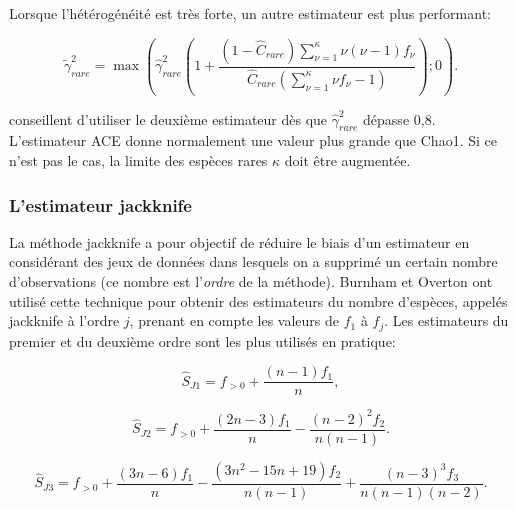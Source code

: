 \documentclass[
  11pt,
  american,
  a4paper,
  extrafontsizes,onecolumn,openright
  ]{memoir}
\newlength{\rf}
\begin{document}
Lorsque l'hétérogénéité est très forte, un autre estimateur est plus performant:

\begin{equation}
  \label{eq:ACEcv2}
  \tilde{\gamma}^{2}_\mathit{rare} 
  = \max\left(
    {\hat{\gamma}}^2_\mathit{rare} \left( 
      1 + \frac{
        \left( 1 - {\hat{C}}_\mathit{rare} \right) \sum^{\kappa}_{\nu = 1}{\nu\left( \nu - 1 \right){f_\nu}}
      }{
        {\hat{C}}_\mathit{rare} \left( \sum^{\kappa}_{\nu = 1}{\nu f_\nu - 1} \right)
      }
    \right) ; 0 
  \right).
\end{equation}

\textcite{Chao2010a} conseillent d'utiliser le deuxième estimateur dès que \({\hat{\gamma}}^2_\mathit{rare}\) dépasse 0,8.
L'estimateur ACE donne normalement une valeur plus grande que Chao1.
Si ce n'est pas le cas, la limite des espèces rares \(\kappa\) doit être augmentée.

\hypertarget{lestimateur-jackknife}{%
\subsubsection{L'estimateur jackknife}\label{lestimateur-jackknife}}

La méthode jackknife a pour objectif de réduire le biais d'un estimateur en considérant des jeux de données dans lesquels on a supprimé un certain nombre d'observations (ce nombre est l'\emph{ordre} de la méthode).
Burnham et Overton \autocite*{Burnham1978,Burnham1979} ont utilisé cette technique pour obtenir des estimateurs du nombre d'espèces, appelés jackknife à l'ordre \(j\), prenant en compte les valeurs de \(f_1\) à \(f_j\).
Les estimateurs du premier et du deuxième ordre sont les plus utilisés en pratique:

\begin{equation}
  \label{eq:Jack1}
  \hat{S}_\mathit{J1} = {f_{>0}} + \frac{\left( n - 1 \right) f_1}{n},
\end{equation}

\begin{equation} 
  \label{eq:Jack2}
  \hat{S}_\mathit{J2} 
  = {f_{>0}} + \frac{\left( 2n - 3 \right) f_1}{n} 
    - \frac{{\left( n - 2 \right)}^2 f_2}{n \left( n - 1 \right)}.
\end{equation}

\begin{equation} 
  \label{eq:Jack3}
  \hat{S}_\mathit{J3} 
  = {f_{>0}} + \frac{\left( 3n - 6 \right) f_1}{n} 
    - \frac{\left( 3n^2 - 15n +19 \right) f_2}{n \left( n - 1 \right)}
    + \frac{{\left( n - 3 \right)}^3 f_3}{n \left( n - 1 \right) \left( n - 2 \right)}.
\end{equation}
\end{document}
